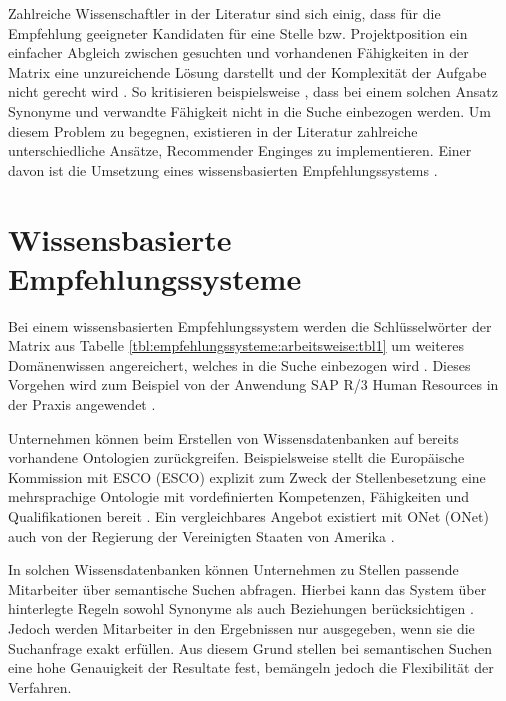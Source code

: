 Zahlreiche Wissenschaftler in der Literatur sind sich einig, dass für die Empfehlung geeigneter Kandidaten für eine Stelle bzw. Projektposition ein einfacher Abgleich zwischen gesuchten und vorhandenen Fähigkeiten in der Matrix eine unzureichende Lösung darstellt \cite[S. 1]{enhancingERecruitment:2012}\cite[S. 1]{faerber:2003}\cite[S. 2]{prospect:2010} und der Komplexität der Aufgabe nicht gerecht wird \cite[S. 1]{malinowski:2008}. So kritisieren beispielsweise \textcite[S. 1f.]{mitre:2014}, dass bei einem solchen Ansatz Synonyme und verwandte Fähigkeit nicht in die Suche einbezogen werden. Um diesem Problem zu begegnen, existieren in der Literatur zahlreiche unterschiedliche Ansätze, Recommender Enginges zu implementieren. Einer davon ist die Umsetzung eines wissensbasierten Empfehlungssystems \cite[S. 2f.]{dwivedi:2017}.

\section{Wissensbasierte Empfehlungssysteme}
\label{ch:empfehlungssysteme:wissensbasierteAnsaetze}
Bei einem wissensbasierten Empfehlungssystem werden die Schlüsselwörter der Matrix aus Tabelle \ref{tbl:empfehlungssysteme:arbeitsweise:tbl1} um weiteres Domänenwissen angereichert, welches in die Suche einbezogen wird \cite[S. 168f.]{recommenderSystems:2016}. Dieses Vorgehen wird zum Beispiel von der Anwendung SAP R/3 Human Resources in der Praxis angewendet \cite[S. 2]{malinowski:2006}.

Unternehmen können beim Erstellen von Wissensdatenbanken auf bereits vorhandene Ontologien zurückgreifen. Beispielsweise stellt die Europäische Kommission mit \acs{ESCO} (\acl{ESCO}) explizit zum Zweck der Stellenbesetzung eine mehrsprachige Ontologie mit vordefinierten Kompetenzen, Fähigkeiten und Qualifikationen bereit \cite[S. 1ff.]{leVrang:2014}. Ein vergleichbares Angebot existiert mit \acs{ONet} (\acl{ONet}) auch von der Regierung der Vereinigten Staaten von Amerika \cite[S. 2]{aCombinedRepresentation:2018}.

In solchen Wissensdatenbanken können Unternehmen zu Stellen passende Mitarbeiter über semantische Suchen abfragen. Hierbei kann das System über hinterlegte Regeln sowohl Synonyme als auch Beziehungen berücksichtigen \cite[S. 2f.]{singto:2013}. Jedoch werden Mitarbeiter in den Ergebnissen nur ausgegeben, wenn sie die Suchanfrage exakt erfüllen. Aus diesem Grund stellen \textcite[S. 3]{bianchini:2008} bei semantischen Suchen eine hohe Genauigkeit der Resultate fest, bemängeln jedoch die Flexibilität der Verfahren.

